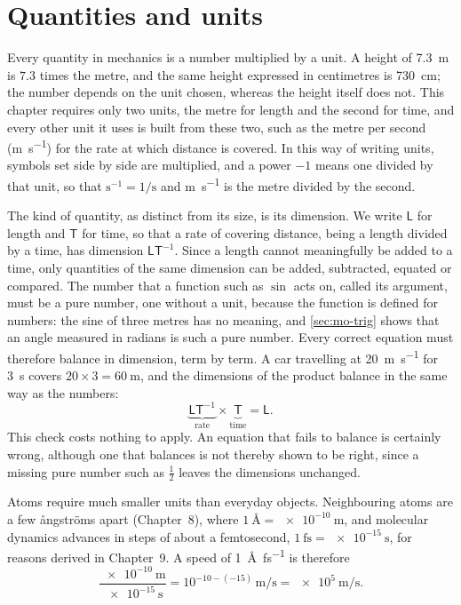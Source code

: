 \section{Quantities and units}
\label{sec:mo-units}

Every quantity in mechanics is a number multiplied by a unit. A height of
\SI{7.3}{\metre} is $7.3$ times the metre, and the same height expressed
in centimetres is \SI{730}{\centi\metre}; the number depends on the unit
chosen, whereas the height itself does not. This chapter requires only
two units, the metre for length and the second for time, and every other
unit it uses is built from these two, such as the metre per second
(\si{\metre\per\second}) for the rate at which distance is covered. In
this way of writing units, symbols set side by side are multiplied, and a
power $-1$ means one divided by that unit, so that $\mathrm{s}^{-1} =
1/\mathrm{s}$ and \si{\metre\per\second} is the metre divided by the
second.

The kind of quantity, as distinct from its size, is its dimension. We
write $\mathsf{L}$ for length and $\mathsf{T}$ for time, so that a rate of
covering distance, being a length divided by a time, has dimension
$\mathsf{L}\mathsf{T}^{-1}$. Since a length cannot meaningfully be added
to a time, only quantities of the same dimension can be added,
subtracted, equated or compared. The number that a function such as
$\sin$ acts on, called its argument, must be a pure number, one without
a unit, because the function is defined for numbers: the sine of three
metres has no meaning, and \cref{sec:mo-trig} shows that an angle
measured in radians is such a pure number. Every correct equation must
therefore balance in dimension, term by term. A car travelling at
\SI{20}{\metre\per\second} for \SI{3}{\second} covers $20\times 3 =
\SI{60}{\metre}$, and the dimensions of the product balance in the same
way as the numbers:
\begin{equation*}
   \underbrace{\mathsf{L}\mathsf{T}^{-1}}_{\text{rate}}
   \times\underbrace{\mathsf{T}}_{\text{time}} = \mathsf{L} .
\end{equation*}
This check costs nothing to apply. An equation that fails to balance is
certainly wrong, although one that balances is not thereby shown to be
right, since a missing pure number such as $\tfrac12$ leaves the
dimensions unchanged.

Atoms require much smaller units than everyday objects. Neighbouring atoms
are a few \aa ngstr\"oms apart (Chapter~8), where $\SI{1}{\angstrom} =
\SI{e-10}{\metre}$, and molecular dynamics advances in steps of about a
femtosecond, $\SI{1}{\femto\second} = \SI{e-15}{\second}$, for reasons
derived in Chapter~9. A speed of \SI{1}{\angstrom\per\femto\second} is
therefore
\begin{equation*}
   \frac{\SI{e-10}{\metre}}{\SI{e-15}{\second}}
   = 10^{-10-(-15)}\,\si{\metre\per\second}
   = \SI{e5}{\metre\per\second}.
\end{equation*}
